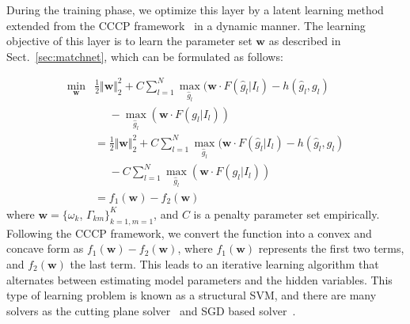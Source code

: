 \documentclass{sig-alternate-05-2015}
\begin{document}
During the training phase, we optimize this layer by a latent learning method extended from the CCCP framework~\cite{cccp02nips} in a dynamic manner. The learning objective of this layer is to learn the parameter set $\mathbf{w}$ as described in Sect.~\ref{sec:matchnet}, which can be formulated as follows:

\begin{equation}
\label{equ:lsvm}
\begin{split}
\min_{\mathbf{w}} & \frac{1}{2} \Vert \mathbf{w} \Vert_2^2 + C \sum_{l=1}^N \max_{\hat{g}_l}( \mathbf{w} \cdot F( \hat{g}_l | I_l) - h( \hat{g}_l, g_l) \\
&~~~~~~ - \max_{\hat{g}_l} ( \mathbf{w} \cdot F( g_l | I_l) ) \\
& = \frac{1}{2} \Vert \mathbf{w} \Vert_2^2 + C \sum_{l=1}^N \max_{\hat{g}_l}( \mathbf{w} \cdot F( \hat{g}_l | I_l) - h( \hat{g}_l, g_l) \\
&~~~~~~ - C \sum_{l=1}^N \max_{\hat{g}_l} ( \mathbf{w} \cdot F( g_l | I_l) ) \\
&=f_1(\mathbf{w}) - f_2(\mathbf{w})
\end{split}
\end{equation}
where $\mathbf{w}=\{\omega_k$, $\Gamma_{km}\}_{k=1, m=1}^K$, and $C$ is a penalty parameter set empirically. Following the CCCP framework, we convert the function into a convex and concave form as $f_1(\mathbf{w}) - f_2(\mathbf{w})$, where $f_1(\mathbf{w})$ represents the first two terms, and $f_2(\mathbf{w})$ the last term. This leads to an iterative learning algorithm that alternates between estimating model parameters and the hidden variables. This type of learning problem is known as a structural SVM, and there are many solvers as the cutting plane solver~\cite{svmstruct} and SGD based solver~\cite{dpm10pami}. 
\end{document}
